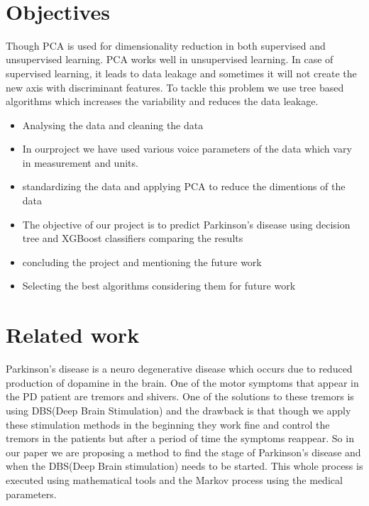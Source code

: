 \documentclass[conference]{IEEEtran}
\begin{document}
\\

\section{Objectives}
Though PCA is used for dimensionality reduction in both supervised and unsupervised learning. PCA works well in unsupervised learning. In case of supervised learning, it leads to data leakage and sometimes it will not create the new axis with discriminant features. To tackle this problem we use tree based algorithms which increases the variability and reduces the data leakage.

\begin{itemize}
    \item Analysing the data and cleaning the data
    \item In ourproject we have used  various voice parameters of the data which vary in measurement and units.
    \item standardizing the data and applying PCA to reduce the dimentions of the data
    \item The objective of our project is to predict Parkinson's disease using decision tree and XGBoost  classifiers comparing the results 
    \item concluding the project and mentioning the future work
    \item Selecting the best algorithms considering them for future work
\end{itemize}

\section {Related work}

Parkinson’s disease is a neuro degenerative disease which occurs due to reduced production of dopamine in the brain. One of the motor symptoms that appear in the PD patient are tremors and shivers. One of the solutions to these tremors is using DBS(Deep Brain Stimulation) and the drawback is that though we apply these stimulation methods in the beginning they work fine and control the tremors in the patients but after a period of time the symptoms reappear.  So in our paper we are proposing a method to find the stage of Parkinson's disease and when the DBS(Deep Brain stimulation) needs to be started. This whole process is executed using mathematical tools and the Markov process using the medical parameters\cite{7391433}.
\end{document}
